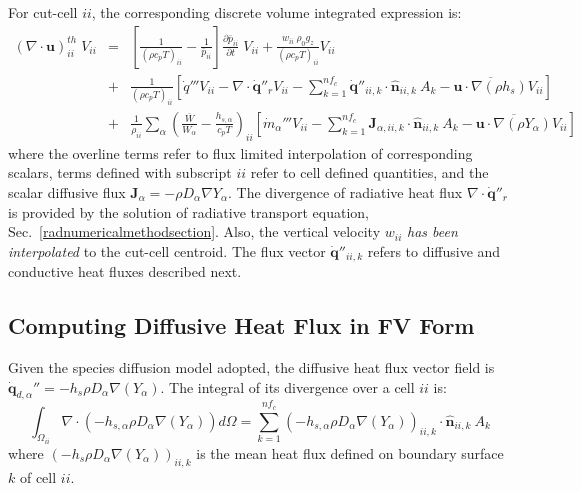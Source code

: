 For cut-cell $ii$, the corresponding discrete volume integrated expression is:
%
\begin{eqnarray}
    ( \nabla \cdot \mathbf{u} )_{ii}^{th} \; V_{ii} &=&
    \left[ \frac{1}{(\rho c_p T)_{ii}} - \frac{1}{\bar{p}_{ii}} \right]
    \frac{\partial \bar{p}_{ii}}{\partial t} \; V_{ii} +
    \frac{w_{ii} \: \rho_0 g_z}{(\rho c_p T)_{ii}} V_{ii} \nonumber \\
    &+& \frac{1}{(\rho c_p T)_{ii}} \left[ \dot{q}''' V_{ii} - \nabla \cdot \dot{\mathbf{q}}''_r V_{ii} -
    \sum_{k=1}^{nf_c} \dot{\mathbf{q}}''_{ii,k} \cdot \hat{\mathbf{n}}_{ii,k} \: A_k
    - \overline{\mathbf{u} \cdot \nabla (\rho h_s)} V_{ii} \right] \nonumber \\
    &+& \frac{1}{\rho_{ii}} \sum_\alpha \left( \frac{\overline{W}}{W_\alpha} - \frac{h_{s,\alpha}}{c_p T} \right)_{ii} \left[ \dot{m}_\alpha''' V_{ii} -
    \sum_{k=1}^{nf_c} \mathbf{J}_{\alpha,ii,k} \cdot \hat{\mathbf{n}}_{ii,k} \: A_k
    - \overline{\mathbf{u} \cdot \nabla (\rho Y_\alpha)} V_{ii} \right] \label{eq:divth2}
\end{eqnarray}
%
where the overline terms refer to flux limited interpolation of corresponding scalars, terms defined with subscript $ii$ refer to cell defined quantities, and the scalar diffusive flux $\mathbf{J}_\alpha=- \rho D_\alpha \nabla Y_\alpha$. The divergence of radiative heat flux $\nabla \cdot \dot{\mathbf{q}}''_r$ is provided by the solution of radiative transport equation, Sec.~\ref{radnumericalmethodsection}.  Also, the vertical velocity $w_{ii}$ \textit{has been interpolated} to the cut-cell centroid. The flux vector $\dot{\mathbf{q}}''_{ii,k}$ refers to diffusive and conductive heat fluxes described next.

\subsection{Computing Diffusive Heat Flux in FV Form}

Given the species diffusion model adopted, the diffusive heat flux vector field is $\dot{\mathbf{q}}_{d,\alpha}''=-h_s \rho D_\alpha \nabla(Y_\alpha)$. The integral of its divergence over a cell $ii$ is:
\begin{equation}
    \int_{\Omega_{ii}} {\nabla \cdot \left(-h_{s,\alpha} \rho D_\alpha \nabla(Y_\alpha) \right)} d\Omega = \sum_{k=1}^{nf_c} \left(-h_{s,\alpha} \rho D_\alpha \nabla(Y_\alpha) \right)_{ii,k} \cdot \hat{\mathbf{n}}_{ii,k}  \: A_k
\end{equation}
where $\left(-h_s \rho D_\alpha \nabla(Y_\alpha) \right)_{ii,k}$ is the mean heat flux defined on boundary surface $k$ of cell $ii$.


